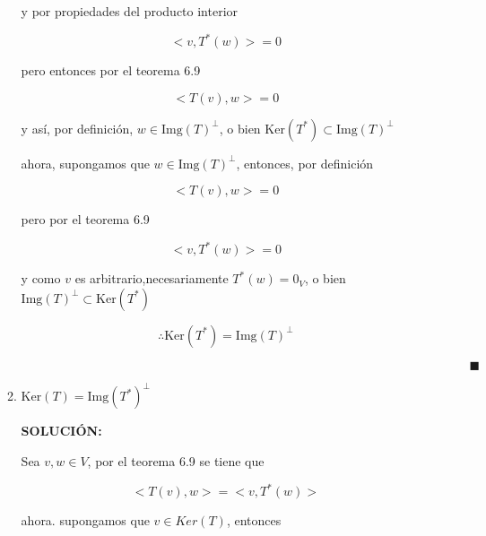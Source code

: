 \documentclass[12pt,a4paper]{article}
\begin{document}
\begin{enumerate}
\begin{enumerate}
        y por propiedades del producto interior
        
        \begin{equation*}
            <v,T^{*}(w)> = 0
        \end{equation*}
        
        pero entonces por el teorema 6.9
        
        \begin{equation*}
            <T(v),w> = 0
        \end{equation*}
        
        y así, por definición, $w \in \text{Img}(T)^{\perp}$, o bien $\text{Ker} (T^{*}) \subset \text{Img}(T)^{\bot}$
        
        ahora, supongamos que $w \in \text{Img}(T)^{\bot}$, entonces, por definición
        
        \begin{equation*}
            <T(v),w> = 0
        \end{equation*}
        
        pero por el teorema 6.9
        
        \begin{equation*}
            <v,T^{*}(w)>= 0
        \end{equation*}
        
        y como $v$ es arbitrario,necesariamente $T^{*}(w) = 0_V$, o bien $\text{Img}(T)^{\bot} \subset \text{Ker}(T^{*})$
        
        \begin{equation*}
            \therefore  \text{Ker} (T^{*}) = \text{Img}(T)^{\bot}
        \end{equation*}
        
        $\hspace{15cm} \blacksquare$
        
        
        
        \item $\text{Ker} (T) = \text{Img}(T^{*})^{\bot}$
        
        \textbf{SOLUCIÓN:}
        
        Sea $v,w \in V$, por el teorema 6.9 se tiene que
        
        \begin{equation*}
            <T(v), w> = <v, T^{*}(w)>
        \end{equation*}
        
        ahora. supongamos que $v \in Ker (T)$, entonces 
        

\end{enumerate}
\end{enumerate}
\end{document}
